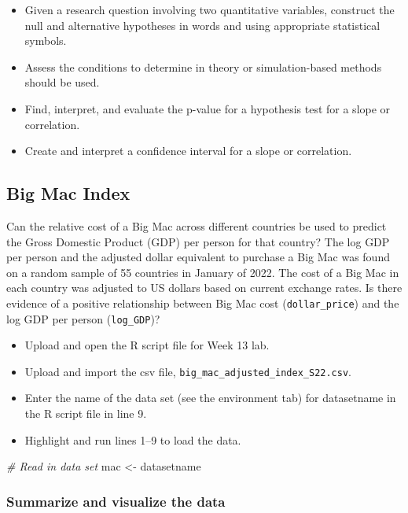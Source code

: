 \documentclass[
]{report}
\newenvironment{Shaded}{\begin{snugshade}}{\end{snugshade}}
\newcommand{\CommentTok}[1]{\textcolor[rgb]{0.56,0.35,0.01}{\textit{#1}}}
\newcommand{\NormalTok}[1]{#1}
\newcommand{\OtherTok}[1]{\textcolor[rgb]{0.56,0.35,0.01}{#1}}
\begin{document}
\begin{itemize}
\item
  Given a research question involving two quantitative variables, construct the null and alternative hypotheses
  in words and using appropriate statistical symbols.
\item
  Assess the conditions to determine in theory or simulation-based methods should be used.
\item
  Find, interpret, and evaluate the p-value for a hypothesis test for a slope or correlation.
\item
  Create and interpret a confidence interval for a slope or correlation.
\end{itemize}

\hypertarget{big-mac-index}{%
\subsection{Big Mac Index}\label{big-mac-index}}

Can the relative cost of a Big Mac across different countries be used to predict the Gross Domestic Product (GDP) per person for that country? The log GDP per person and the adjusted dollar equivalent to purchase a Big Mac was found on a random sample of 55 countries in January of 2022. The cost of a Big Mac in each country was adjusted to US dollars based on current exchange rates. Is there evidence of a positive relationship between Big Mac cost (\texttt{dollar\_price}) and the log GDP per person (\texttt{log\_GDP})?

\begin{itemize}
\item
  Upload and open the R script file for Week 13 lab.
\item
  Upload and import the csv file, \texttt{big\_mac\_adjusted\_index\_S22.csv}.
\item
  Enter the name of the data set (see the environment tab) for datasetname in the R script file in line 9.
\item
  Highlight and run lines 1--9 to load the data.
\end{itemize}

\begin{Shaded}
\begin{Highlighting}[]
\CommentTok{\# Read in data set }
\NormalTok{mac }\OtherTok{\textless{}{-}}\NormalTok{ datasetname}
\end{Highlighting}
\end{Shaded}

\hypertarget{summarize-and-visualize-the-data-7}{%
\subsubsection*{Summarize and visualize the data}\label{summarize-and-visualize-the-data-7}}
\end{document}
